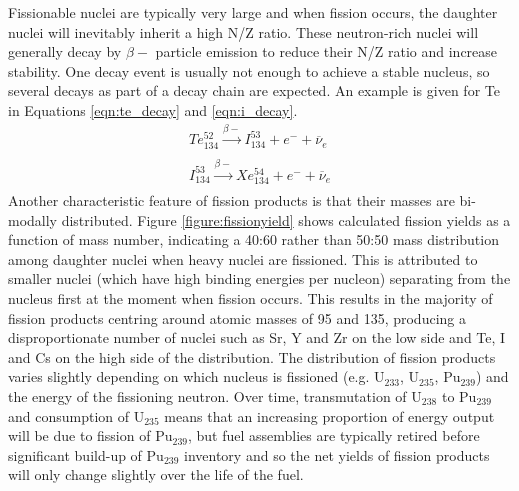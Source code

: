 Fissionable nuclei are typically very large and when fission occurs, the daughter nuclei will inevitably inherit a high N/Z ratio. These neutron-rich nuclei will generally decay by $\beta-$ particle emission to reduce their N/Z ratio and increase stability. One decay event is usually not enough to achieve a stable nucleus, so several decays as part of a decay chain are expected. An example is given for Te in Equations \ref{eqn:te_decay} and \ref{eqn:i_decay}.
\begin{gather}
Te_{134}^{52} \xrightarrow[]{\beta-} I_{134}^{53}+ e^{-} + \overline{\nu}_{e}
\label{eqn:te_decay} \\
I_{134}^{53} \xrightarrow[]{\beta-} Xe_{134}^{54} + e^{-} + \overline{\nu}_{e}
\label{eqn:i_decay}
\end{gather}
Another characteristic feature of fission products is that their masses are bi-modally distributed. Figure \ref{figure:fissionyield} shows calculated fission yields as a function of mass number, indicating a 40:60 rather than 50:50 mass distribution among daughter nuclei when heavy nuclei are fissioned. This is attributed to smaller nuclei (which have high binding energies per nucleon) separating from the nucleus first at the moment when fission occurs. This results in the majority of fission products centring around atomic masses of 95 and 135, producing a disproportionate number of nuclei such as Sr, Y and Zr on the low side and Te, I and Cs on the high side of the distribution. The distribution of fission products varies slightly depending on which nucleus is fissioned (e.g. U$_{233}$, U$_{235}$, Pu$_{239}$) and the energy of the fissioning neutron. Over time, transmutation of U$_{238}$ to Pu$_{239}$ and consumption of U$_{235}$ means that an increasing proportion of energy output will be due to fission of Pu$_{239}$, but fuel assemblies are typically retired before significant build-up of Pu$_{239}$ inventory and so the net yields of fission products will only change slightly over the life of the fuel.

